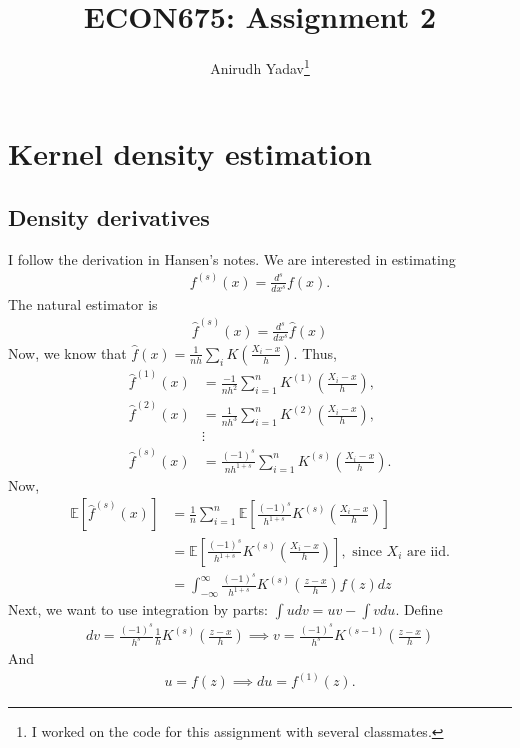 \documentclass[12pt]{article}
\title{ECON675: Assignment 2}
\author{Anirudh Yadav\thanks{I worked on the code for this assignment with several classmates.}}
\newcommand{\E}{\mathbb{E}}
\begin{document}
\maketitle
\setcounter{tocdepth}{2}
\tableofcontents

\newpage

\section{Kernel density estimation}

\subsection{Density derivatives}
I follow the derivation in Hansen's notes. We are interested in estimating
\begin{align*}
f^{(s)}(x) = \frac{d^s}{dx^s}f(x).
\end{align*}
The natural estimator is
\begin{align*}
\hat f^{(s)}(x)= \frac{d^s}{dx^s}\hat f(x)
\end{align*}
Now, we know that $\hat f(x) = \frac{1}{nh}\sum_i K\left(\frac{X_i - x}{h}\right)$. Thus,
\begin{align*}
\hat f^{(1)}(x) &= \frac{-1}{nh^2}\sum_{i=1}^n K^{(1)}\left(\frac{X_i - x}{h}\right),\\
\hat f^{(2)}(x) &= \frac{1}{nh^3}\sum_{i=1}^n K^{(2)}\left(\frac{X_i - x}{h}\right),\\
&\vdots \\
\hat f^{(s)}(x) &= \frac{(-1)^s}{nh^{1+s}}\sum_{i=1}^n K^{(s)}\left(\frac{X_i - x}{h}\right).
\end{align*}
Now,
\begin{align*}
\E[\hat f^{(s)}(x)] &= \frac{1}{n} \sum_{i=1}^n \E\left[ \frac{(-1)^s}{h^{1+s}}K^{(s)}\left(\frac{X_i - x}{h}\right)\right]\\
&=\E\left[ \frac{(-1)^s}{h^{1+s}}K^{(s)}\left(\frac{X_i - x}{h}\right)\right], \text{ since $X_i$ are iid}.\\
&=\int_{-\infty}^{\infty} \frac{(-1)^s}{h^{1+s}}K^{(s)}\left(\frac{z - x}{h}\right)f(z)dz
\end{align*}
Next, we want to use integration by parts: $\int u dv = uv - \int vdu$. Define
\begin{align*}
dv = \frac{(-1)^s}{h^{s}}\frac{1}{h}K^{(s)}\left(\frac{z - x}{h}\right) \implies v = \frac{(-1)^s}{h^{s}}K^{(s-1)}\left(\frac{z - x}{h}\right)
\end{align*}
And
\begin{align*}
u = f(z) \implies du = f^{(1)}(z).
\end{align*}
\end{document}
